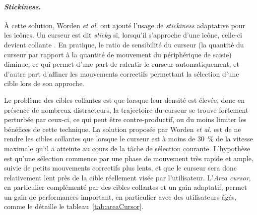 \begin{appendices}
	\paragraph{\emph{Stickiness}.}
	À cette solution, Worden \emph{et al.} ont ajouté l'usage de \emph{stickiness} adaptative pour les icônes. Un curseur est dit \emph{sticky} si, lorsqu'il s'approche d'une icône, celle-ci devient \og collante \fg{}. En pratique, le ratio de sensibilité du curseur (la quantité du curseur par rapport à la quantité de mouvement du périphérique de saisie) diminue, ce qui permet d'une part de ralentir le curseur automatiquement, et d'autre part d'affiner les mouvements correctifs permettant la sélection d'une cible lors de son approche.
	
	Le problème des cibles collantes est que lorsque leur densité est élevée, donc en présence de nombreux distracteurs, la trajectoire du curseur se trouve fortement perturbée par ceux-ci, ce qui peut être contre-productif, ou du moins limiter les bénéfices de cette technique. La solution proposée par Worden \emph{et al.} est de ne rendre les cibles collantes que lorsque le curseur est à moins de 30~\%{} de la vitesse maximale qu'il a atteinte au cours de la tâche de sélection courante. L'hypothèse est qu'une sélection commence par une phase de mouvement très rapide et ample, suivie de petits mouvements correctifs plus lents, et que le curseur sera donc relativement lent près de la cible réellement visée par l'utilisateur. L'\emph{Area cursor}, en particulier complémenté par des cibles collantes et un gain adaptatif, permet un gain de performances important, en particulier avec des utilisateurs âgés, comme le détaille le tableau~\ref{tab:areaCursor}.
	

\end{appendices}
